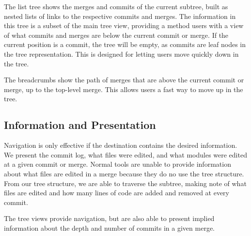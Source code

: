 \documentclass[conference, draftclsnofoot]{IEEEtran}
\begin{document}

The list tree shows the merges and commits of the current subtree, built as
nested lists of links to the respective commits and merges. The information in
this tree is a subset of the main tree view, providing a method users with a
view of what commits and merges are below the current commit or merge. If the
current position is a commit, the tree will be empty, as commits are leaf
nodes in the tree representation. This is designed for letting users move
quickly down in the tree.



The breadcrumbs show the path of merges that are above the current commit or
merge, up to the top-level merge. This allows users a fast way to move up in
the tree.



\subsection{Information and Presentation}

Navigation is only effective if the destination contains the desired
information. We present the commit log, what files were edited, and what
modules were edited at a given commit or merge. Normal tools are unable to
provide information about what files are edited in a merge because they do no
use the tree structure. From our tree structure, we are able to traverse the
subtree, making note of what files are edited and how many lines of code are
added and removed at every commit.


The tree views provide navigation, but are also able to present implied
information about the depth and number of commits in a given merge.
\end{document}
